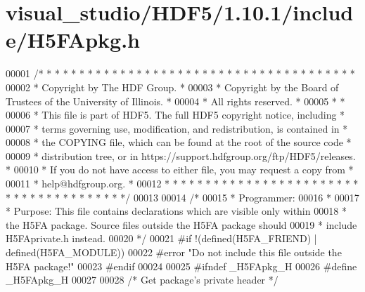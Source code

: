 \hypertarget{visual__studio_2_h_d_f5_21_810_81_2include_2_h5_f_apkg_8h_source}{}\section{visual\+\_\+studio/\+H\+D\+F5/1.10.1/include/\+H5\+F\+Apkg.h}
\label{visual__studio_2_h_d_f5_21_810_81_2include_2_h5_f_apkg_8h_source}

\begin{DoxyCode}
00001 \textcolor{comment}{/* * * * * * * * * * * * * * * * * * * * * * * * * * * * * * * * * * * * * * *}
00002 \textcolor{comment}{ * Copyright by The HDF Group.                                               *}
00003 \textcolor{comment}{ * Copyright by the Board of Trustees of the University of Illinois.         *}
00004 \textcolor{comment}{ * All rights reserved.                                                      *}
00005 \textcolor{comment}{ *                                                                           *}
00006 \textcolor{comment}{ * This file is part of HDF5.  The full HDF5 copyright notice, including     *}
00007 \textcolor{comment}{ * terms governing use, modification, and redistribution, is contained in    *}
00008 \textcolor{comment}{ * the COPYING file, which can be found at the root of the source code       *}
00009 \textcolor{comment}{ * distribution tree, or in https://support.hdfgroup.org/ftp/HDF5/releases.  *}
00010 \textcolor{comment}{ * If you do not have access to either file, you may request a copy from     *}
00011 \textcolor{comment}{ * help@hdfgroup.org.                                                        *}
00012 \textcolor{comment}{ * * * * * * * * * * * * * * * * * * * * * * * * * * * * * * * * * * * * * * */}
00013 
00014 \textcolor{comment}{/*}
00015 \textcolor{comment}{ * Programmer:}
00016 \textcolor{comment}{ *}
00017 \textcolor{comment}{ * Purpose:    This file contains declarations which are visible only within}
00018 \textcolor{comment}{ *        the H5FA package.  Source files outside the H5FA package should}
00019 \textcolor{comment}{ *        include H5FAprivate.h instead.}
00020 \textcolor{comment}{ */}
00021 \textcolor{preprocessor}{#if !(defined(H5FA\_FRIEND) | defined(H5FA\_MODULE))}
00022 \textcolor{preprocessor}{#error "Do not include this file outside the H5FA package!"}
00023 \textcolor{preprocessor}{#endif}
00024 
00025 \textcolor{preprocessor}{#ifndef \_H5FApkg\_H}
00026 \textcolor{preprocessor}{#define \_H5FApkg\_H}
00027 
00028 \textcolor{comment}{/* Get package's private header */}

\end{DoxyCode}

